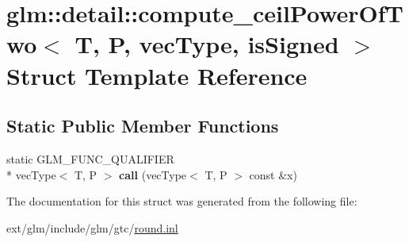 \hypertarget{structglm_1_1detail_1_1compute__ceil_power_of_two}{\section{glm\-:\-:detail\-:\-:compute\-\_\-ceil\-Power\-Of\-Two$<$ T, P, vec\-Type, is\-Signed $>$ Struct Template Reference}
\label{structglm_1_1detail_1_1compute__ceil_power_of_two}
}
\subsection*{Static Public Member Functions}
\begin{DoxyCompactItemize}
\item 
\hypertarget{structglm_1_1detail_1_1compute__ceil_power_of_two_a81872e12467950a992a4d10c6d73bc45}{static G\-L\-M\-\_\-\-F\-U\-N\-C\-\_\-\-Q\-U\-A\-L\-I\-F\-I\-E\-R \\*
vec\-Type$<$ T, P $>$ {\bfseries call} (vec\-Type$<$ T, P $>$ const \&x)}\label{structglm_1_1detail_1_1compute__ceil_power_of_two_a81872e12467950a992a4d10c6d73bc45}

\end{DoxyCompactItemize}


The documentation for this struct was generated from the following file\-:\begin{DoxyCompactItemize}
\item 
ext/glm/include/glm/gtc/\hyperlink{round_8inl}{round.\-inl}\end{DoxyCompactItemize}
